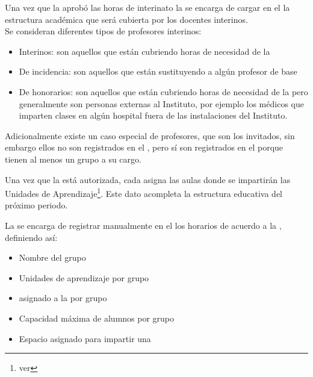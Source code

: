 \begin{PDescripcion}
\begin{enumerate}
		
		\Ppaso[\PSubProceso] 
		Una vez que la  aprobó las horas de interinato la  se encarga de cargar en el  la estructura académica que será cubierta por los docentes interinos.\\
		Se consideran diferentes tipos de profesores interinos:
		\begin{itemize}
			\item Interinos: son aquellos que están cubriendo horas de necesidad de la 
			\item De incidencia: son aquellos que están sustituyendo a algún profesor de base
			\item De honorarios: son aquellos que están cubriendo horas de necesidad de la  pero generalmente son personas externas al Instituto, por ejemplo los médicos que imparten clases en algún hospital fuera de las instalaciones del Instituto.
		\end{itemize}
		Adicionalmente existe un caso especial de profesores, que son los invitados, sin embargo ellos no son registrados en el , pero sí son registrados en el  porque tienen al menos un grupo a su cargo.
		
		\Ppaso[\PSubProceso] 
		Una vez que la  está autorizada, cada  asigna las aulas donde se impartirán las Unidades de Aprendizaje\footnote{ver }. Este dato acompleta la estructura educativa del próximo periodo.

		\Ppaso[\PSubProceso] 
		La  se encarga de registrar manualmente en el  los horarios de acuerdo a la , definiendo así:
		\begin{itemize}
			\item Nombre del grupo
			\item Unidades de aprendizaje por grupo
			\item {} asignado a la  por grupo
			\item Capacidad máxima de alumnos por grupo
			\item Espacio asignado para impartir una 
		\end{itemize}
		

\end{enumerate}
\end{PDescripcion}
